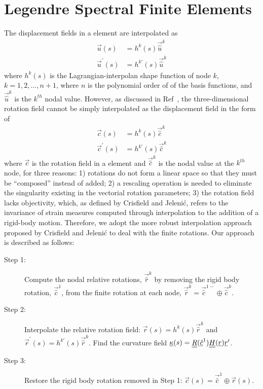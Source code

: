 \section{Legendre Spectral Finite Elements}
The displacement fields in a element are interpolated as
\begin{align}
    \label{InterpolateDisp}
    \vec{u}(s) &= h^k(s) \vec{\hat{u}}^k \\
    \label{InterpolateDispp}
    \vec{u}^\prime(s) &= h^{k\prime}(s) \vec{\hat{u}}^k
\end{align}
where $h^k(s)$ is the
Lagrangian-interpolan shape function of node $k$, $k=1,2,...,n+1$, where $n$
is the polynomial order of of the basis functions, and $\vec{\hat{u}}^k$ is
the $k^{th}$ nodal value.
However, as discussed in Ref~\cite{Bauchau-etal:2009}, the three-dimensional rotation field cannot be
simply interpolated as the displacement field in the form of
\begin{align}
    \label{InterpolateRot}
    \vec{c}(s) &= h^k(s) \vec{\hat{c}}^k \\
    \label{InterpolateRotp}
    \vec{c}^\prime(s) &= h^{k \prime}(s) \vec{\hat{c}}^k 
\end{align}    
where $\vec{c}$ is the rotation field in a element and $\vec{\hat{c}}^k$ is
the nodal value at the $k^{th}$ node, for three reasons: 1) rotations do not
form a linear space so that they must be  ``composed'' instead of added; 2)
a rescaling operation is needed to eliminate the singularity existing in the
vectorial rotation parameters; 3) the rotation field lacks objectivity,
which, as
defined by Crisfield and Jeleni\'c\cite{Crisfield1999}, refers to the
invariance of strain measures computed through interpolation to the addition
of a rigid-body motion. Therefore, we adopt the more robust interpolation
approach proposed by Crisfield and Jeleni\'c \cite{Crisfield1999} to deal
with the finite rotations. Our approach is described as follows:
\begin{description}
    \item[Step 1:] Compute the nodal relative rotations, $\vec{\hat{r}}^k$ by removing the rigid body rotation, $\vec{\hat{c}}^1$, from the finite rotation at each node, $\vec{\hat{r}}^k = \vec{\hat{c}}^{1-} \oplus \vec{\hat{c}}^k$.
    \item[Step 2:] Interpolate the relative rotation field: $\vec{r}(s) = h^k(s) \vec{\hat{r}}^k$ and $\vec{r}^\prime(s) = h^{k \prime}(s) \vec{\hat{r}}^k$. Find the curvature field $\underline{\kappa}(s) = \underline{\underline{R}}(\underline{\hat{c}}^1) \underline{\underline{H}}(\underline{r}) \underline{r}^\prime$.
    \item[Step 3:] Restore the rigid body rotation removed in Step 1: $\vec{c}(s) = \vec{\hat{c}}^1 \oplus \vec{r}(s)$.
\end{description} 
